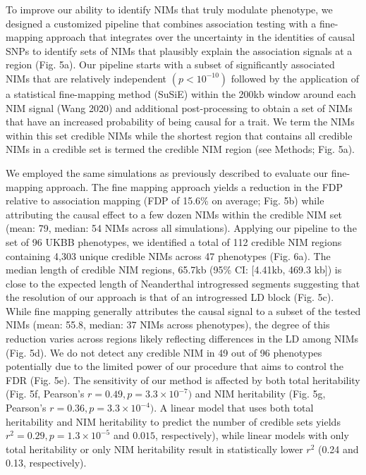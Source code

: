 To improve our ability to identify NIMs that truly modulate phenotype, we designed a customized pipeline that combines association testing with a fine-mapping approach that integrates over the uncertainty in the identities of causal SNPs to identify sets of NIMs that plausibly explain the association signals at a region (Fig. 5a). Our pipeline starts with a subset of significantly associated NIMs that are relatively independent $(p < 10^{-10})$ followed by the application of a statistical fine-mapping method (SuSiE) within the 200kb window around each NIM signal (Wang 2020) and additional post-processing to obtain a set of NIMs that have an increased probability of being causal for a trait. We term the NIMs within this set credible NIMs while the shortest region that contains all credible NIMs in a credible set is termed the credible NIM region (see Methods; Fig. 5a). 

We employed the same simulations as previously described to evaluate our fine-mapping approach. The fine mapping approach yields a reduction in the FDP relative to association mapping (FDP of 15.6\% on average; Fig. 5b) while attributing the causal effect to a few dozen NIMs within the credible NIM set (mean: 79, median: 54 NIMs across all simulations). Applying our pipeline to the set of 96 UKBB phenotypes, we identified a total of 112 credible NIM regions containing 4,303 unique credible NIMs across 47 phenotypes (Fig. 6a). The median length of credible NIM regions, 65.7kb (95\% CI: [4.41kb, 469.3 kb]) is close to the expected length of Neanderthal introgressed segments \cite{skov2020nature} suggesting that the resolution of our approach is that of an introgressed LD block (Fig. 5c). While fine mapping generally attributes the causal signal to a subset of the tested NIMs (mean: 55.8, median: 37 NIMs across phenotypes), the degree of this reduction varies across regions likely reflecting differences in the LD among NIMs (Fig. 5d). We do not detect any credible NIM in 49 out of 96 phenotypes potentially due to the limited power of our procedure that aims to control the FDR (Fig. 5e). The sensitivity of our method is affected by both total heritability (Fig. 5f, Pearson’s $r = 0.49 , p = 3.3\times 10^{-7})$  and NIM heritability (Fig. 5g, Pearson’s $r = 0.36, p = 3.3\times10^{-4})$. A linear model that uses both total heritability and NIM heritability to predict the number of credible sets yields $r^2 = 0.29, p = 1.3\times10^{-5}$ and $0.015$, respectively), while linear models with only total heritability or only NIM heritability result in statistically lower $r^2$ (0.24 and 0.13, respectively).

